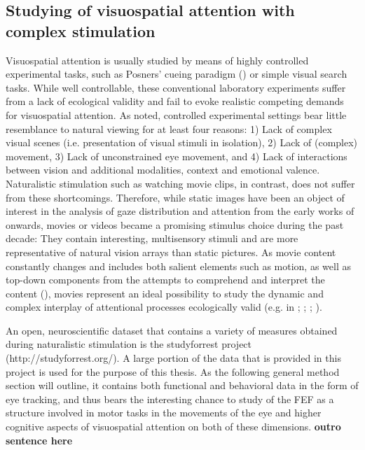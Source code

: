 \documentclass[a4paper, 12pt]{scrreprt}
\begin{document}
\subsection{Studying of visuospatial attention with complex stimulation }
Visuospatial attention is usually studied by means of highly controlled experimental tasks, such as Posners' cueing paradigm (\cite{posner1980attention}) or simple visual search tasks. While well controllable, these conventional laboratory experiments suffer from a lack of ecological validity and fail to evoke realistic competing demands for visuospatial attention. As \textcite{hasson2004intersubject} noted, controlled experimental settings bear little resemblance to natural viewing for at least four reasons: 1) Lack of complex visual scenes (i.e. presentation of visual stimuli in isolation), 2) Lack of (complex) movement, 3) Lack of unconstrained eye movement, and 4) Lack of interactions between vision and additional modalities, context and emotional valence. Naturalistic stimulation such as watching movie clips, in contrast, does not suffer from these shortcomings. Therefore, while static images have been an object of interest in the analysis of gaze distribution and attention from the early works of \textcite{yarbus1967eye} onwards, movies or videos became a promising stimulus choice during the past decade: They contain interesting, multisensory stimuli and are more representative of natural vision arrays than static pictures. As movie content constantly changes and includes both salient elements such as motion, as well as top-down components from the attempts to comprehend and interpret the content (\cite{ross2013eye}), movies represent an ideal possibility to study the dynamic and complex interplay of attentional processes ecologically valid (e.g. in \textcite{hasson2004intersubject}; \cite{carmi2006visual}; \cite{tseng2009quantifying}; \cite{dorr2010variability}).

An open, neuroscientific dataset that contains a variety of measures obtained during naturalistic stimulation is the studyforrest project (http://studyforrest.org/). A large portion of the data that is provided in this project is used for the purpose of this thesis. As the following general method section will outline, it contains both functional and behavioral data in the form of eye tracking, and thus bears the interesting chance to study of the FEF as a structure involved in motor tasks in the movements of the eye and higher cognitive aspects of visuospatial attention on both of these dimensions. \textbf{outro sentence here}
\end{document}

